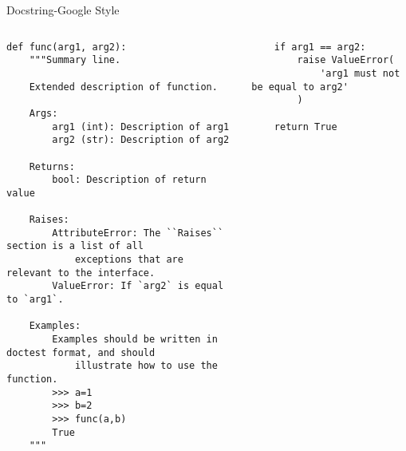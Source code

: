 \begin{frame}[fragile]{Docstring-Google Style}
    \tiny
    \begin{columns}
        \begin{lstlisting}
def func(arg1, arg2):
    """Summary line.

    Extended description of function.

    Args:
        arg1 (int): Description of arg1
        arg2 (str): Description of arg2

    Returns:
        bool: Description of return value

    Raises:
        AttributeError: The ``Raises`` section is a list of all 
            exceptions that are relevant to the interface.
        ValueError: If `arg2` is equal to `arg1`.

    Examples:
        Examples should be written in doctest format, and should
            illustrate how to use the function.
        >>> a=1
        >>> b=2
        >>> func(a,b)
        True
    """
            \end{lstlisting}
            \begin{lstlisting}
    if arg1 == arg2:
        raise ValueError(
            'arg1 must not be equal to arg2'
        )

    return True
            \end{lstlisting}
    \end{columns}

\end{frame}
